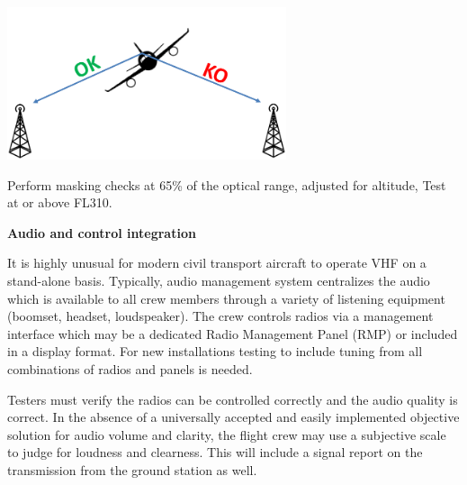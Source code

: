 \documentclass[
]{book}
\begin{document}
\includegraphics[width=3.22917in,height=1.761in]{media/20/image4.png}

Perform masking checks at 65\% of the optical range, adjusted for altitude, Test
at or above FL310.

\textbf{Audio and control integration}

It is highly unusual for modern civil transport aircraft to operate VHF on a
stand-alone basis. Typically, audio management system centralizes the audio
which is available to all crew members through a variety of listening equipment
(boomset, headset, loudspeaker). The crew controls radios via a management
interface which may be a dedicated Radio Management Panel (RMP) or included in
a display format. For new installations testing to include tuning from all
combinations of radios and panels is needed.

Testers must verify the radios can be controlled correctly and the audio
quality is correct. In the absence of a universally accepted and easily
implemented objective solution for audio volume and clarity, the flight crew
may use a subjective scale to judge for loudness and clearness. This will
include a signal report on the transmission from the ground station as well.
\end{document}

